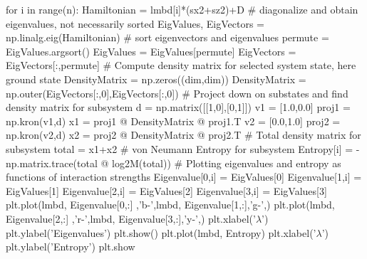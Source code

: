 \documentclass[%
oneside,                 %
final,                   %
10pt]{article}
\begin{document}
for i in range(n): 
    Hamiltonian = lmbd[i]*(sx2+sz2)+D
    # diagonalize and obtain eigenvalues, not necessarily sorted
    EigValues, EigVectors = np.linalg.eig(Hamiltonian)
    # sort eigenvectors and eigenvalues
    permute = EigValues.argsort()
    EigValues = EigValues[permute]
    EigVectors = EigVectors[:,permute]
    # Compute density matrix for selected system state, here ground state
    DensityMatrix = np.zeros((dim,dim))
    DensityMatrix = np.outer(EigVectors[:,0],EigVectors[:,0])
    # Project down on substates and find density matrix for subsystem
    d = np.matrix([[1,0],[0,1]])
    v1 = [1.0,0.0]
    proj1 = np.kron(v1,d)
    x1 = proj1 @ DensityMatrix @ proj1.T
    v2 = [0.0,1.0]
    proj2 = np.kron(v2,d)
    x2 = proj2 @ DensityMatrix @ proj2.T
    # Total density matrix for subsystem
    total = x1+x2
    # von Neumann Entropy for subsystem 
    Entropy[i] = -np.matrix.trace(total @ log2M(total))
    # Plotting eigenvalues and entropy as functions of interaction strengths
    Eigenvalue[0,i] = EigValues[0]
    Eigenvalue[1,i] = EigValues[1]
    Eigenvalue[2,i] = EigValues[2]
    Eigenvalue[3,i] = EigValues[3]
plt.plot(lmbd, Eigenvalue[0,:] ,'b-',lmbd, Eigenvalue[1,:],'g-',)
plt.plot(lmbd, Eigenvalue[2,:] ,'r-',lmbd, Eigenvalue[3,:],'y-',)
plt.xlabel('$\lambda$')
plt.ylabel('Eigenvalues')
plt.show()
plt.plot(lmbd, Entropy)
plt.xlabel('$\lambda$')
plt.ylabel('Entropy')          
plt.show

\epycod




\end{document}
